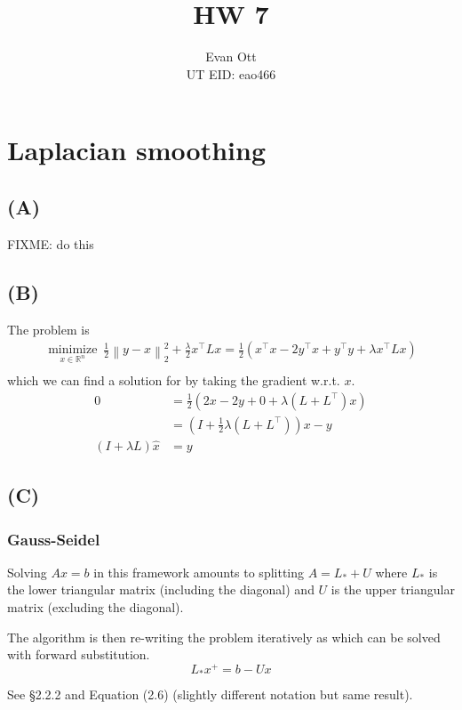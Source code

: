 \documentclass{article}
\title{\vspace{-6ex}HW 7\vspace{-2ex}}
\author{Evan Ott \\ UT EID: eao466\vspace{-2ex}}
\newcommand{\op}[2]{{\ensuremath{\underset{ #2 }{\operatorname{ #1 }}~}}}
\newcommand{\norm}[1]{{ \ensuremath{ \left\lVert  #1 \right\rVert  }  }}
\begin{document}
\maketitle

\section{Laplacian smoothing}

\subsection{(A)}
FIXME: do this


\subsection{(B)}
The problem is
\begin{align*}
\op{minimize}{x\in \mathbb{R}^n} \frac{1}{2}\norm{y-x}_2^2 + \frac{\lambda}{2}x^\top L x=\frac{1}{2}\left(x^\top x - 2y^\top x + y^\top y + \lambda x^\top L x\right)\\
\end{align*}
which we can find a solution for by taking the gradient w.r.t. $x$.
\begin{align*}
0&=\frac{1}{2}\left(2x - 2y + 0 + \lambda (L + L^\top) x\right)\\
&= \left(I + \frac{1}{2}\lambda (L + L^\top)\right)x - y\\
\left(I + \lambda L\right)\hat{x}  &= y
\end{align*}

\subsection{(C)}

\subsubsection{Gauss-Seidel}
Solving $Ax=b$ in this framework amounts to splitting $A=L_*+U$ where $L_*$ is the lower triangular matrix
(including the diagonal) and $U$ is the upper triangular matrix (excluding the diagonal).

The algorithm is then re-writing the problem iteratively as which can be solved with forward substitution.
$$L_* x^+ = b - Ux$$

See \cite{barrett1994templates} \S2.2.2 and Equation (2.6) (slightly different notation but same result).
\end{document}
